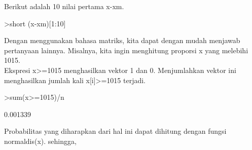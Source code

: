 \documentclass[a4paper,10pt]{article}
\begin{document}
\begin{eulernotebook}
\begin{eulercomment}
\begin{eulercomment}
\begin{eulercomment}
Berikut adalah 10 nilai pertama x-xm.
\end{eulercomment}
\begin{eulerprompt}
>short (x-xm)[1:10]
\end{eulerprompt}
\begin{euleroutput}
  [1.4664,  2.8367,  -4.573,  10.419,  -6.075,  -4.3474,  2.7294,
  -3.4693,  -1.1123,  -0.21472]
\end{euleroutput}
\begin{eulercomment}
Dengan menggunakan bahasa matriks, kita dapat dengan mudah menjawab
pertanyaan lainnya. Misalnya, kita ingin menghitung proporsi x yang
melebihi 1015.\\
Ekspresi x\textgreater{}=1015 menghasilkan vektor 1 dan 0. Menjumlahkan vektor ini
menghasilkan jumlah kali x[i]\textgreater{}=1015 terjadi.
\end{eulercomment}
\begin{eulerprompt}
>sum(x>=1015)/n
\end{eulerprompt}
\begin{euleroutput}
  0.001339
\end{euleroutput}
\begin{eulercomment}
Probabilitas yang diharapkan dari hal ini dapat dihitung dengan fungsi
normaldis(x). sehingga,


\end{eulercomment}
\end{eulercomment}
\end{eulercomment}
\end{eulernotebook}
\end{document}
